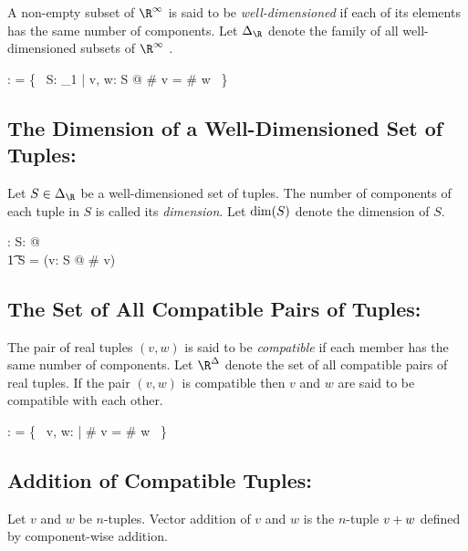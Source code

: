 \documentclass{amsart}
\begin{document}
A non-empty subset of $\Rinf$ is said to be \textit{well-dimensioned} if each of its elements has the same number
of components.
Let $\DeltaRinf$ denote the family of all well-dimensioned subsets of $\Rinf$ .

\begin{axdef}
	\DeltaRinf: \Fam \Rinf
\where
	\DeltaRinf = \{~ S: \power_1 \Rinf | \forall v, w: S @ \# v = \# w ~\}
\end{axdef}

\subsection{The Dimension of a Well-Dimensioned Set of Tuples: }

Let $S \in \DeltaRinf$ be a well-dimensioned set of tuples.
The number of components of each tuple in $S$ is called its \textit{dimension}.
Let $\operatorname{dim}(S)$ denote the dimension of $S$.

\begin{axdef}
\dimRinf: \DeltaRinf \fun \nat
\where
\forall S: \DeltaRinf @ \\
\t1	\dimRinf S = (\mu v: S @ \# v)
\end{axdef}

\subsection{The Set of All Compatible Pairs of Tuples: }

The pair of real tuples $(v, w)$ is said to be \textit{compatible} if each member has the same number of components.
Let $\RinfDelta$ denote the set of all compatible pairs of real tuples.
If the pair $(v, w)$ is compatible then $v$ and $w$ are said to be compatible with each other.

\begin{axdef}
	\RinfDelta: \Rinf \rel \Rinf
\where
	\RinfDelta = \{~ v, w: \Rinf | \# v = \# w ~\}
\end{axdef}

\subsection{Addition of Compatible Tuples: }

Let $v$ and $w$ be $n$-tuples.
Vector addition of $v$ and $w$ is the $n$-tuple $v \mathbin{+} w$ defined by component-wise addition.
\end{document}
